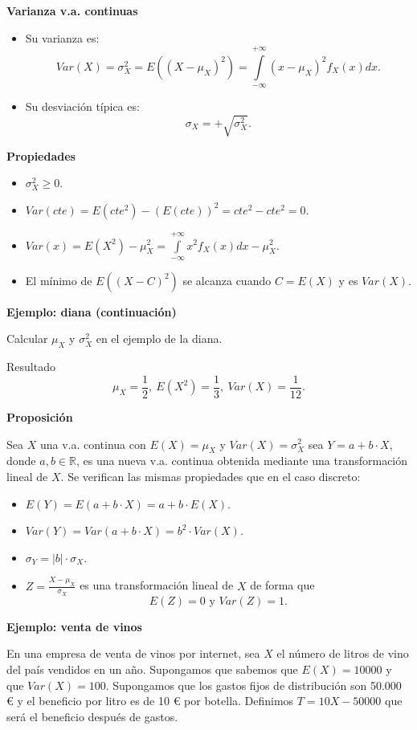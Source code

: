\documentclass[]{book}
\providecommand{\tightlist}{%
  \setlength{\itemsep}{0pt}\setlength{\parskip}{0pt}}
\begin{document}
\textbf{Varianza v.a. continuas}

\begin{itemize}
\tightlist
\item
  Su varianza es:
  \[
  Var(X)=\sigma_{X}^2=E((X-\mu_{X})^2)=
  \displaystyle\int\limits_{-\infty}^{+\infty} (x-\mu_{X})^2 f_{X}(x)dx.
  \]
\item
  Su desviación típica es: \[\sigma_{X}=+\sqrt{\sigma_{X}^2}.\]
\end{itemize}

\textbf{Propiedades}

\begin{itemize}
\tightlist
\item
  \(\sigma_{X}^2\geq 0\).
\item
  \(Var(cte)=E(cte^2)-(E(cte))^2= cte^2 - cte^2=0\).
\item
  \(\displaystyle Var(x)=E(X^2)-\mu_{X}^2=\int\limits_{-\infty}^{+\infty}x^2 f_{X}(x)dx - \mu_{X}^2.\)
\item
  El mínimo de \(E((X-C)^2)\) se alcanza cuando \(C=E(X)\) y es \(Var(X)\).
\end{itemize}

\textbf{Ejemplo: diana (continuación)}

Calcular \(\mu_{X}\) y \(\sigma_{X}^2\) en el ejemplo de la diana.

Resultado
\[\mu_{X}=\frac12,\ E(X^2)=\frac13,\ Var(X)=\frac1{12}.\]

\textbf{Proposición}

Sea \(X\) una v.a. continua con \(E(X)=\mu_{X}\) y \(Var(X)=\sigma_{X}^2\) sea \(Y=a+b\cdot X\), donde
\(a,b\in\mathbb{R}\), es una nueva v.a. continua obtenida mediante una transformación lineal de \(X\).
Se verifican las mismas propiedades que en el caso discreto:

\begin{itemize}
\tightlist
\item
  \(E(Y)=E(a+b\cdot X)=a+b\cdot E(X)\).
\item
  \(Var(Y)=Var(a+b\cdot X)=b^2\cdot Var(X)\).
\item
  \(\sigma_{Y}=|b|\cdot \sigma_{X}\).
\item
  \(Z=\frac{X-\mu_{X}}{\sigma_{X}}\) es una transformación
  lineal de \(X\) de forma que
  \[E(Z)=0 \mbox{ y } Var(Z)=1.\]
\end{itemize}

\textbf{Ejemplo: venta de vinos}

En una empresa de venta de vinos por internet, sea
\(X\) el número de litros de vino del país vendidos en un año.
Supongamos que sabemos que \(E(X)=10000\) y que \(Var(X)=100\).
Supongamos que los gastos fijos de distribución son
50.000 € y el beneficio por litro es de 10 € por botella.
Definimos \(T=10 X-50000\) que será el beneficio después de gastos.
\end{document}

